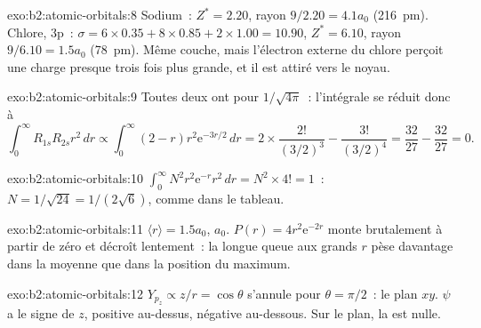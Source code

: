 \begin{solution}{exo:b2:atomic-orbitals:8}
Sodium~: $Z^* = 2.20$, rayon $9/2.20 = 4.1a_0$ (\qty{216}{pm}). Chlore, 3p~:
$\sigma = 6 \times 0.35 + 8 \times 0.85 + 2 \times 1.00 = 10.90$, $Z^* = 6.10$, rayon
$9/6.10 = 1.5a_0$ (\qty{78}{pm}). Même couche, mais l'électron externe du chlore
perçoit une charge presque trois fois plus grande, et il est attiré vers le noyau.
\end{solution}

\begin{solution}{exo:b2:atomic-orbitals:9}
Toutes deux ont pour  $1/\sqrt{4\pi}$~: l'intégrale se réduit donc à
\[
  \int_0^\infty R_{1s}R_{2s}r^2\,dr \propto \int_0^\infty (2 - r)r^2\mathrm e^{-3r/2}\,dr =
  2 \times \frac{2!}{(3/2)^3} - \frac{3!}{(3/2)^4} = \frac{32}{27} - \frac{32}{27} = 0 .
\]
\end{solution}

\begin{solution}{exo:b2:atomic-orbitals:10}
$\int_0^\infty N^2r^2\mathrm e^{-r}r^2\,dr = N^2 \times 4! = 1$~: $N = 1/\sqrt{24} =
1/(2\sqrt6)$, comme dans le tableau.
\end{solution}

\begin{solution}{exo:b2:atomic-orbitals:11}
$\langle r\rangle = 1.5a_0$,  $a_0$. $P(r) = 4r^2\mathrm e^{-2r}$ monte
brutalement à partir de zéro et décroît lentement~: la longue queue aux grands $r$ pèse davantage dans la
moyenne que dans la position du maximum.
\end{solution}

\begin{solution}{exo:b2:atomic-orbitals:12}
$Y_{p_z} \propto z/r = \cos\theta$ s'annule pour $\theta = \pi/2$~: le plan $xy$.
$\psi$ a le signe de $z$, positive au-dessus, négative au-dessous. Sur le plan, la
 est nulle.
\end{solution}

